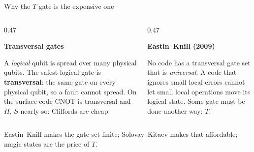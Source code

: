 \documentclass[aspectratio=169,11pt]{beamer}
\newcommand{\blocktitle}[1]{{\bfseries #1}\par\vskip1mm}
\begin{document}
\setcounter{framenumber}{10}
\begin{frame}{Why the $T$ gate is the expensive one}
  \begin{columns}[T]
    \begin{column}{0.47\textwidth}
      \begin{greyblock}
        \blocktitle{Transversal gates}
        A \emph{logical} qubit is spread over many physical qubits. The safest logical gate is \textbf{transversal}: the same gate on every physical qubit, so a fault cannot spread. On the surface code CNOT is transversal and $H$, $S$ nearly so: Cliffords are cheap.
      \end{greyblock}
    \end{column}
    \begin{column}{0.47\textwidth}
      \begin{greyblock}
        \blocktitle{Eastin--Knill (2009)}
        No code has a transversal gate set that is \emph{universal}. A code that ignores small local errors cannot let small local operations move its logical state. Some gate must be done another way: $T$.
      \end{greyblock}
    \end{column}
  \end{columns}
  \begin{takeaway}Eastin--Knill makes the gate set finite; Solovay--Kitaev makes that affordable; magic states are the price of $T$.\end{takeaway}
\end{frame}
\end{document}
